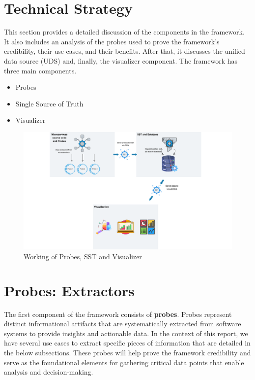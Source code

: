 \section{Technical Strategy}\label{sec:tech-strategy}

This section provides a detailed discussion of the components in the framework. It also includes an analysis of the probes used to prove the framework's credibility, their use cases, and their benefits. After that, it discusses the unified data source (UDS) and, finally, the visualizer component. The framework has three main components.
\begin{itemize}
    \item Probes
    \item Single Source of Truth
    \item Visualizer
\end{itemize}

\begin{figure}[H]
    \centering
    \includegraphics[width=1\textwidth]{figures/vision.png}
    \caption[Framework working]{Working of Probes, SST and Visualizer}
	\label{fig_vision}
\end{figure}

\section{Probes: Extractors}\label{sec:component-probes}

The first component of the framework consists of \textbf{probes}. Probes represent distinct informational artifacts that are systematically extracted from software systems to provide insights and actionable data. In the context of this report, we have several use cases to extract specific pieces of information that are detailed in the below subsections. These probes will help prove the framework credibility and serve as the foundational elements for gathering critical data points that enable analysis and decision-making. 

